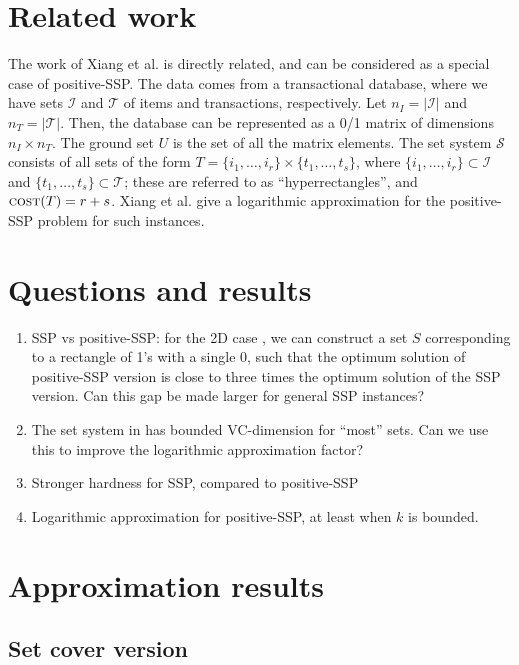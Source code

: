 \documentclass[twoside, leqno, twocolumn]{article}
\newcommand{\cost}{\textsc{cost}}
\begin{document}
\section{Related work}

The work of Xiang et al. \cite{xiang:dmkd2011} is directly related, and can be
considered as a special case of positive-SSP. The data comes from a transactional database,
where we have sets $\mathcal{I}$ and $\mathcal{T}$ of items and transactions, respectively.
Let $n_I=|\mathcal{I}|$ and $n_T=|\mathcal{T}|$. Then, the database
can be represented as a 0/1 matrix of dimensions $n_I\times n_T$.
The ground set $U$ is the set of all the matrix elements.
The set system $\mathcal{S}$ consists of all sets of the form
$T=\{i_1,\ldots,i_r\}\times\{t_1,\ldots,t_s\}$, where $\{i_1,\ldots,i_r\}\subset\mathcal{I}$
and $\{t_1,\ldots,t_s\}\subset\mathcal{T}$; these are referred to as 
``hyperrectangles'', and $\cost(T)=r+s$.
Xiang et al. give a logarithmic approximation for the positive-SSP problem
for such instances.

\section{Questions and results}

\begin{enumerate}
\item
SSP vs positive-SSP: for the 2D case \cite{xiang:dmkd2011}, 
we can construct a set $S$ corresponding to a rectangle of 1's with a single 0,
such that the optimum solution of positive-SSP version is close to three times
the optimum solution of the SSP version.
Can this gap be made larger for general SSP instances?
\item
The set system in \cite{xiang:dmkd2011} has bounded VC-dimension for ``most'' sets. 
Can we use this to improve the logarithmic approximation factor?
\item
Stronger hardness for SSP, compared to positive-SSP
\item
Logarithmic approximation for positive-SSP, at least when $k$ is bounded.
\end{enumerate}

\section{Approximation results}

\subsection{Set cover version}
\end{document}
